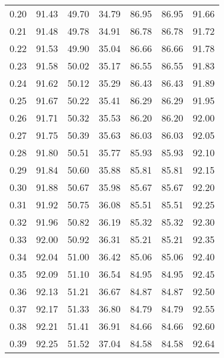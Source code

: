 \begin{tabular}{|c|c|c|c|c|c|c|}
      0.20 &     91.43 &     49.70 &      34.79 &   86.95 &      86.95 &         91.66 \\
      0.21 &     91.48 &     49.78 &      34.91 &   86.78 &      86.78 &         91.72 \\
      0.22 &     91.53 &     49.90 &      35.04 &   86.66 &      86.66 &         91.78 \\
      0.23 &     91.58 &     50.02 &      35.17 &   86.55 &      86.55 &         91.83 \\
      0.24 &     91.62 &     50.12 &      35.29 &   86.43 &      86.43 &         91.89 \\
      0.25 &     91.67 &     50.22 &      35.41 &   86.29 &      86.29 &         91.95 \\
      0.26 &     91.71 &     50.32 &      35.53 &   86.20 &      86.20 &         92.00 \\
      0.27 &     91.75 &     50.39 &      35.63 &   86.03 &      86.03 &         92.05 \\
      0.28 &     91.80 &     50.51 &      35.77 &   85.93 &      85.93 &         92.10 \\
      0.29 &     91.84 &     50.60 &      35.88 &   85.81 &      85.81 &         92.15 \\
      0.30 &     91.88 &     50.67 &      35.98 &   85.67 &      85.67 &         92.20 \\
      0.31 &     91.92 &     50.75 &      36.08 &   85.51 &      85.51 &         92.25 \\
      0.32 &     91.96 &     50.82 &      36.19 &   85.32 &      85.32 &         92.30 \\
      0.33 &     92.00 &     50.92 &      36.31 &   85.21 &      85.21 &         92.35 \\
      0.34 &     92.04 &     51.00 &      36.42 &   85.06 &      85.06 &         92.40 \\
      0.35 &     92.09 &     51.10 &      36.54 &   84.95 &      84.95 &         92.45 \\
      0.36 &     92.13 &     51.21 &      36.67 &   84.87 &      84.87 &         92.50 \\
      0.37 &     92.17 &     51.33 &      36.80 &   84.79 &      84.79 &         92.55 \\
      0.38 &     92.21 &     51.41 &      36.91 &   84.66 &      84.66 &         92.60 \\
      0.39 &     92.25 &     51.52 &      37.04 &   84.58 &      84.58 &         92.64 \\

\end{tabular}
